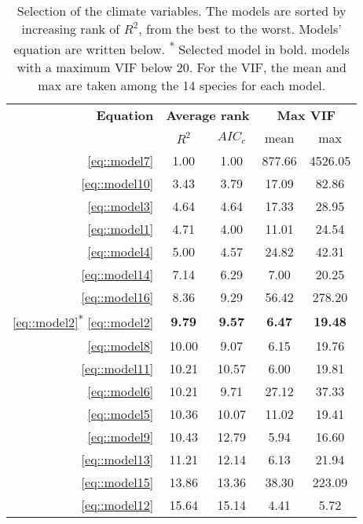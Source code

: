 \begin{refsection}
\begin{table}[h!]
\centering
\caption{Selection of the climate variables. The models are sorted by increasing rank of $ R^2 $, \ie from the best to the worst. Models' equation are written below. \textsuperscript{*} Selected model in bold. \dag models with a maximum VIF below 20. For the VIF, the mean and max are taken among the 14 species for each model.}
\label{tab::climSelection}
\begin{tabular}{@{}rcccc@{}}
	\toprule
	\textbf{Equation} & \multicolumn{2}{c}{\textbf{Average rank}} & \multicolumn{2}{c}{\textbf{Max VIF}} \\
		\cmidrule(lr){2-3} \cmidrule(lr){4-5}
		& $ R^2 $ & $ AIC_c $ & mean & max \\
	\midrule
	\ref{eq::model7} & 1.00 & 1.00 & 877.66 & 4526.05 \\
	\ref{eq::model10} & 3.43 & 3.79 & 17.09 & 82.86 \\
	\ref{eq::model3} & 4.64 & 4.64 & 17.33 & 28.95 \\
	\ref{eq::model1} & 4.71 & 4.00 & 11.01 & 24.54 \\
	\ref{eq::model4} & 5.00 & 4.57 & 24.82 & 42.31 \\
	\ref{eq::model14} & 7.14 & 6.29 & 7.00 & 20.25 \\
	\ref{eq::model16} & 8.36 & 9.29 & 56.42 & 278.20 \\
	\ref{eq::model2}\textsuperscript{*} \dag \ref{eq::model2} & \textbf{9.79} & \textbf{9.57} & \textbf{6.47} & \textbf{19.48} \\
	\ref{eq::model8} \dag & 10.00 & 9.07 & 6.15 & 19.76 \\
	\ref{eq::model11} \dag & 10.21 & 10.57 & 6.00 & 19.81 \\
	\ref{eq::model6} & 10.21 & 9.71 & 27.12 & 37.33 \\
	\ref{eq::model5} \dag & 10.36 & 10.07 & 11.02 & 19.41 \\
	\ref{eq::model9} \dag & 10.43 & 12.79 & 5.94 & 16.60 \\
	\ref{eq::model13} & 11.21 & 12.14 & 6.13 & 21.94 \\
	\ref{eq::model15} & 13.86 & 13.36 & 38.30 & 223.09 \\
	\ref{eq::model12} \dag & 15.64 & 15.14 & 4.41 & 5.72 \\
	\bottomrule
\end{tabular}
\end{table}


\end{refsection}
